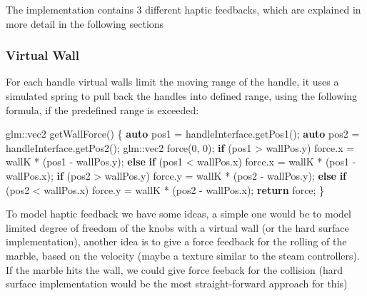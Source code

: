 \documentclass[]{article}
\newenvironment{Shaded}{}{}
\newcommand{\ControlFlowTok}[1]{\textcolor[rgb]{0.00,0.44,0.13}{\textbf{#1}}}
\newcommand{\DecValTok}[1]{\textcolor[rgb]{0.25,0.63,0.44}{#1}}
\newcommand{\KeywordTok}[1]{\textcolor[rgb]{0.00,0.44,0.13}{\textbf{#1}}}
\newcommand{\NormalTok}[1]{#1}
\begin{document}
The implementation contains 3 different haptic feedbacks, which are
explained in more detail in the following sections

\hypertarget{virtual-wall}{%
\subsubsection{Virtual Wall}\label{virtual-wall}}

For each handle virtual walls limit the moving range of the handle, it
uses a simulated spring to pull back the handles into defined range,
using the following formula, if the predefined range is exceeded:

\begin{Shaded}
\begin{Highlighting}[]
\NormalTok{    glm::vec2 getWallForce()}
\NormalTok{    \{}
        \KeywordTok{auto}\NormalTok{      pos1 = handleInterface.getPos1();}
        \KeywordTok{auto}\NormalTok{      pos2 = handleInterface.getPos2();}
\NormalTok{        glm::vec2 force(}\DecValTok{0}\NormalTok{, }\DecValTok{0}\NormalTok{);}
        \ControlFlowTok{if}\NormalTok{ (pos1 > wallPos.y)}
\NormalTok{            force.x = wallK * (pos1 - wallPos.y);}
        \ControlFlowTok{else} \ControlFlowTok{if}\NormalTok{ (pos1 < wallPos.x)}
\NormalTok{            force.x = wallK * (pos1 - wallPos.x);}
        \ControlFlowTok{if}\NormalTok{ (pos2 > wallPos.y)}
\NormalTok{            force.y = wallK * (pos2 - wallPos.y);}
        \ControlFlowTok{else} \ControlFlowTok{if}\NormalTok{ (pos2 < wallPos.x)}
\NormalTok{            force.y = wallK * (pos2 - wallPos.x);}
        \ControlFlowTok{return}\NormalTok{ force;}
\NormalTok{    \}}
\end{Highlighting}
\end{Shaded}

To model haptic feedback we have some ideas, a simple one would be to
model limited degree of freedom of the knobs with a virtual wall (or the
hard surface implementation), another idea is to give a force feedback
for the rolling of the marble, based on the velocity (maybe a texture
similar to the steam controllers). If the marble hits the wall, we could
give force feeback for the collision (hard surface implementation would
be the most straight-forward approach for this)
\end{document}
